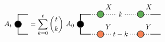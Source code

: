 
\renewcommand{\graphTensorSpacing}{1.1}
\renewcommand{\graphTensorTwoStart}{2.25*\graphTensorSpacing}
\[
\begin{tikzpicture}[baseline=-0.65ex]
	\node[circle,draw=black!80,thick,fill=black,label=left:$A_{t}$] (ATT) at (0,0) {};

	\draw[thick, draw=black] (ATT) -- (0,\graphLineSpacing) -- (\graphLineSpacing,\graphLineSpacing) {};
	\draw[thick, draw=black] (ATT) -- (0,-\graphLineSpacing) -- (\graphLineSpacing,-\graphLineSpacing) {};
\end{tikzpicture}
=
\sum_{k=0}^{t}
{t \choose k}
\begin{tikzpicture}[baseline=-0.65ex]
	\node[circle,draw=black!80,thick,fill=black,label=left:$A_{0}$] (AT) at (\graphTensorTwoStart,0) {};
	\node[circle,draw=black!80,thick,fill=myGreen,label=above right:$X$] (X) at (\graphTensorTwoStart + 2*\graphLineSpacing,\graphLineSpacing) {};
	\node[circle,draw=black!80,thick,fill=myOrange,label=above right:$Y$] (Y) at (\graphTensorTwoStart + 2*\graphLineSpacing,-\graphLineSpacing) {};
	\node (k) at (\graphTensorTwoStart + 4*\graphLineSpacing,\graphLineSpacing) {$k$};
	\node (tk) at (\graphTensorTwoStart + 4*\graphLineSpacing,-\graphLineSpacing) {$t-k$};
	\node[circle,draw=black!80,thick,fill=myGreen,label=above right:$X$] (X1) at (\graphTensorTwoStart + 6*\graphLineSpacing,\graphLineSpacing) {};
	\node[circle,draw=black!80,thick,fill=myOrange,label=above right:$Y$] (Y1) at (\graphTensorTwoStart + 6*\graphLineSpacing,-\graphLineSpacing) {};

	\draw[thick, draw=black] (AT) -- (\graphTensorTwoStart,\graphLineSpacing) -- (\graphTensorTwoStart + \graphLineSpacing,\graphLineSpacing) ;
	\draw[thick, dotted] (\graphTensorTwoStart + \graphLineSpacing,\graphLineSpacing) -- (X) -- (k) -- (X1) -- (\graphTensorTwoStart + 7*\graphLineSpacing,\graphLineSpacing) {};
	\draw[thick, draw=black] (\graphTensorTwoStart + 7*\graphLineSpacing,\graphLineSpacing) -- (\graphTensorTwoStart + 8*\graphLineSpacing,\graphLineSpacing) {};

	\draw[thick, draw=black] (AT) -- (\graphTensorTwoStart,-\graphLineSpacing) -- (\graphTensorTwoStart + \graphLineSpacing,-\graphLineSpacing) {};
	\draw[thick, dotted] (\graphTensorTwoStart + \graphLineSpacing,-\graphLineSpacing) -- (Y) -- (tk) -- (Y1) -- (\graphTensorTwoStart + 7*\graphLineSpacing,-\graphLineSpacing) {};
	\draw[thick, draw=black] (\graphTensorTwoStart + 7*\graphLineSpacing,-\graphLineSpacing) -- (\graphTensorTwoStart + 8*\graphLineSpacing,-\graphLineSpacing) {};
\end{tikzpicture}
\]